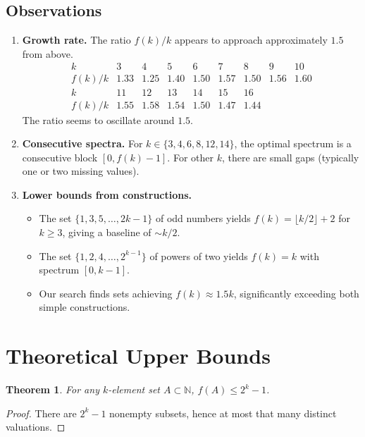 \documentclass[11pt]{article}
\newtheorem{theorem}{Theorem}
\newcommand{\NN}{\mathbb{N}}
\begin{document}
\subsection{Observations}

\begin{enumerate}
\item \textbf{Growth rate.} The ratio $f(k)/k$ appears to approach approximately $1.5$ from above.
\[
\begin{array}{c|cccccccc}
k & 3 & 4 & 5 & 6 & 7 & 8 & 9 & 10 \\
f(k)/k & 1.33 & 1.25 & 1.40 & 1.50 & 1.57 & 1.50 & 1.56 & 1.60 \\
\hline
k & 11 & 12 & 13 & 14 & 15 & 16 \\
f(k)/k & 1.55 & 1.58 & 1.54 & 1.50 & 1.47 & 1.44
\end{array}
\]
The ratio seems to oscillate around $1.5$.

\item \textbf{Consecutive spectra.} For $k \in \{3,4,6,8,12,14\}$, the optimal spectrum is a consecutive block $[0, f(k)-1]$.
For other $k$, there are small gaps (typically one or two missing values).

\item \textbf{Lower bounds from constructions.}
\begin{itemize}
\item The set $\{1, 3, 5, \dots, 2k-1\}$ of odd numbers yields $f(k) = \lfloor k/2 \rfloor + 2$ for $k \ge 3$, giving a baseline of $\sim k/2$.
\item The set $\{1, 2, 4, \dots, 2^{k-1}\}$ of powers of two yields $f(k) = k$ with spectrum $[0, k-1]$.
\item Our search finds sets achieving $f(k) \approx 1.5k$, significantly exceeding both simple constructions.
\end{itemize}
\end{enumerate}

\section{Theoretical Upper Bounds}

\begin{theorem}
For any $k$-element set $A \subset \NN$, $f(A) \le 2^k - 1$.
\end{theorem}
\begin{proof}
There are $2^k - 1$ nonempty subsets, hence at most that many distinct valuations.
\end{proof}
\end{document}
